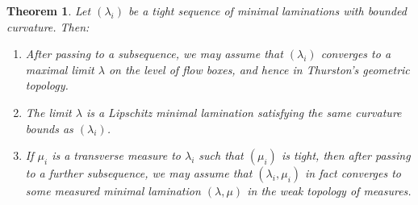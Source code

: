 \documentclass[reqno,10pt]{amsart}
\newtheorem{theorem}{Theorem}[section]
\theoremstyle{definition}
\numberwithin{equation}{section}
\begin{document}
\begin{theorem}
Let $(\lambda_i)$ be a tight sequence of minimal laminations with bounded curvature. Then:
\begin{enumerate}
\item After passing to a subsequence, we may assume that $(\lambda_i)$ converges to a maximal limit $\lambda$ on the level of flow boxes, and hence in Thurston's geometric topology.
\item The limit $\lambda$ is a Lipschitz minimal lamination satisfying the same curvature bounds as $(\lambda_i)$.
\item If $\mu_i$ is a transverse measure to $\lambda_i$ such that $(\mu_i)$ is tight, then after passing to a further subsequence, we may assume that $(\lambda_i, \mu_i)$ in fact converges to some measured minimal lamination $(\lambda, \mu)$ in the weak topology of measures.
\end{enumerate}
\end{theorem}
\end{document}
